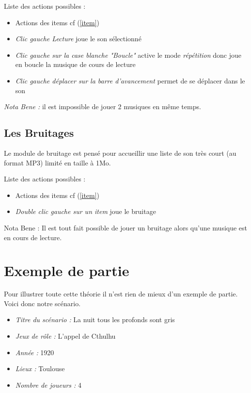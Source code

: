\documentclass[12pt]{article}
\begin{document}
Liste des actions possibles :
\begin{itemize}
    \item Actions des items cf (\ref{item})
    \item \emph{Clic gauche Lecture} joue le son sélectionné
    \item \emph{Clic gauche sur la case blanche "Boucle"} active le mode \emph{répétition} donc joue en boucle la musique de cours de lecture
    \item \emph{Clic gauche déplacer sur la barre d'avancement} permet de se déplacer dans le son
\end{itemize}
\emph{Nota Bene :} il est impossible de jouer 2 musiques en même temps.

\subsection{Les Bruitages}\label{bruitage}
Le module de bruitage est pensé pour accueillir une liste de son très court (au format MP3) limité en taille à 1Mo.

Liste des actions possibles :
\begin{itemize}
    \item Actions des items cf (\ref{item})
    \item \emph{Double clic gauche sur un item} joue le bruitage
\end{itemize}

Nota Bene : Il est tout fait possible de jouer un bruitage alors qu'une musique est en cours de lecture.

\section{Exemple de partie}\label{exemple}
Pour illustrer toute cette théorie il n'est rien de mieux d'un exemple de partie.
Voici donc notre scénario.
\begin{itemize}
    \item \emph{Titre du scénario :} La nuit tous les profonds sont gris
    \item \emph{Jeux de rôle :} L'appel de Cthulhu
    \item \emph{Année :} 1920
    \item \emph{Lieux :} Toulouse
    \item \emph{Nombre de joueurs : } 4
\end{itemize}
\end{document}
